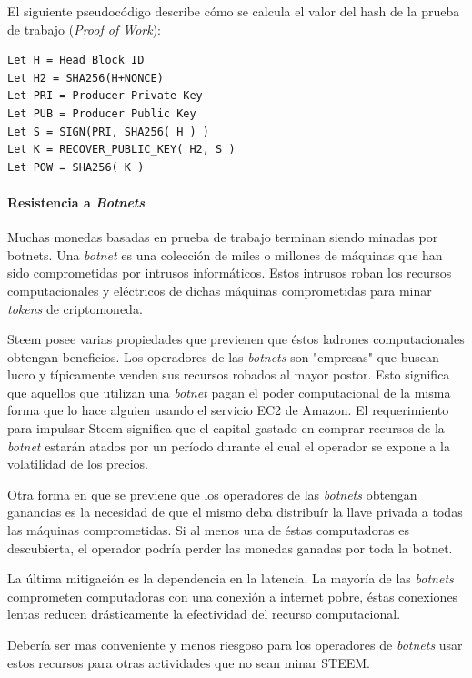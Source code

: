\documentclass[a4paper,titlepage,final]{article}
\begin{document}
El siguiente pseudocódigo describe cómo se calcula el valor del hash de la prueba de trabajo (\textit{Proof of Work}):

\begin{lstlisting}[frame=single]
Let H = Head Block ID
Let H2 = SHA256(H+NONCE)
Let PRI = Producer Private Key
Let PUB = Producer Public Key
Let S = SIGN(PRI, SHA256( H ) )
Let K = RECOVER_PUBLIC_KEY( H2, S )
Let POW = SHA256( K )
\end{lstlisting}

\paragraph{Resistencia a \textit{Botnets}}

Muchas monedas basadas en prueba de trabajo terminan siendo minadas por botnets. Una \textit{botnet} es una colección de miles o millones de máquinas que han sido comprometidas por intrusos informáticos. Estos intrusos roban los recursos computacionales y eléctricos de dichas máquinas comprometidas para minar \textit{tokens} de criptomoneda.

Steem posee varias propiedades que previenen que éstos ladrones computacionales obtengan beneficios. Los operadores de las \textit{botnets} son "empresas" que buscan lucro y típicamente venden sus recursos robados al mayor postor. Esto significa que aquellos que utilizan una \textit{botnet} pagan el poder computacional de la misma forma que lo hace alguien usando el servicio EC2 de Amazon. El requerimiento para impulsar Steem significa que el capital gastado en comprar recursos de la \textit{botnet} estarán atados por un período durante el cual el operador se expone a la volatilidad de los precios.

Otra forma en que se previene que los operadores de las \textit{botnets} obtengan ganancias es la necesidad de que el mismo deba distribuír la llave privada a todas las máquinas comprometidas. Si al menos una de éstas computadoras es descubierta, el operador podría perder las monedas ganadas por toda la botnet.

La última mitigación es la dependencia en la latencia. La mayoría de las \textit{botnets} comprometen computadoras con una conexión a internet pobre, éstas conexiones lentas reducen drásticamente la efectividad del recurso computacional.

Debería ser mas conveniente y menos riesgoso para los operadores de \textit{botnets} usar estos recursos para otras actividades que no sean minar STEEM.
\end{document}
